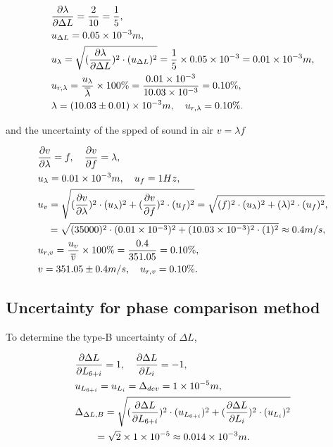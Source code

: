    \[
    \begin{split}
        &\frac{\partial \lambda}{\partial \Delta L}=\frac{2}{10}=\frac{1}{5},\\ 
        &u_{\Delta L}=0.05\times 10^{-3}m,\\
        &u_{\lambda}=\sqrt{(\frac{\partial \lambda}{\partial \Delta L})^2\cdot 
          (u_{\Delta L})^2}=\frac{1}{5}\times 0.05\times 10^{-3}=0.01\times 10^{-3}m,\\ 
        &u_{r,\lambda}=\frac{u_{\lambda}}{\overline{\lambda}}\times 
        100\%=\frac{0.01\times 10^{-3}}{10.03\times 10^{-3}}=0.10\%,\\ 
        &\lambda=(10.03\pm0.01)\times 10^{-3}m,\quad u_{r,\lambda}=0.10\%.
    \end{split}
    \]

    and the uncertainty of the spped of sound in air $v=\lambda f$

    \[
    \begin{split}
        &\frac{\partial v}{\partial \lambda}=f,\quad \frac{\partial v}{\partial
          f}=\lambda,\\ 
        &u_{\lambda}=0.01\times 10^{-3}m,\quad u_{f}=1Hz,\\
        &u_{v}=\sqrt{(\frac{\partial v}{\partial \lambda})^2\cdot
          (u_{\lambda})^2+(\frac{\partial v}{\partial f})^2\cdot
          (u_{f})^2}=\sqrt{(f)^2\cdot (u_{\lambda})^2+(\lambda)^2\cdot
          (u_{f})^2},\\ 
        &\quad =\sqrt{(35000)^2\cdot(0.01\times 10^{-3})^2+(10.03\times 10^{-3})^2\cdot(1)^2}
        \approx0.4m/s,\\
        &u_{r,v}=\frac{u_v}{\overline{v}}\times 100\%=\frac{0.4}{351.05}=0.10\%,\\
        &v=351.05\pm0.4 m/s,\quad u_{r,v}=0.10\%.
    \end{split}
    \]

\subsection{Uncertainty for phase comparison method}

    To determine the type-B uncertainty of $\Delta L$,

    \[
    \begin{split}
        &\frac{\partial \Delta L}{\partial L_{6+i}}=1,\quad \frac{\partial
          \Delta L}{\partial L_i}=-1,\\ 
        &u_{L_{6+i}}=u_{L_i}=\Delta_{dev}=1\times 10^{-5}m,\\
        &\Delta_{\Delta L,B}=\sqrt{(\frac{\partial \Delta L}{\partial
            L_{6+i}})^2\cdot (u_{L_{6+i}})^2+(\frac{\partial \Delta L}{\partial
            L_i})^2\cdot (u_{L_i})^2}\\ 
        &\quad\quad =\sqrt{2}\times 1\times 10^{-5}\approx0.014\times 10^{-3}m.\\ 
    \end{split}
    \]


